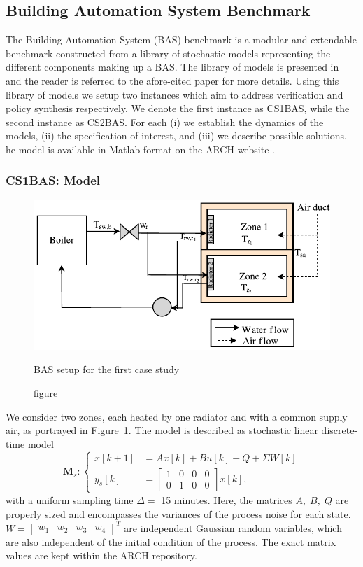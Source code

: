 \subsection{Building Automation System Benchmark}
The Building Automation System (BAS) benchmark is a modular and extendable benchmark  constructed from a  library of stochastic models representing the different components making up a BAS. The library of models is presented in~\cite{Cauchi18ADHS} and the reader is referred to the afore-cited paper for more details. Using this
library of models we setup two instances which aim to address  verification and policy synthesis respectively. We denote the first instance as CS1BAS, while the second instance as CS2BAS.
For each (i) we establish the dynamics of the models, (ii) the specification of interest, and (iii) we describe possible solutions.
he model is available in Matlab format on the ARCH website .

\subsubsection{CS1BAS: Model} 
\begin{figure}[h!]
    \centering
 	\includegraphics[width=0.5\columnwidth]{figures/Cs1.pdf}
 	\caption{figure}{BAS setup for the first case study}
 	\label{fig:cs1:setup}
 \end{figure}
 
We consider two zones, each heated by one radiator and with a common supply air, as portrayed in Figure~\ref{fig:cs1:setup}. 
The model is described as stochastic linear discrete-time model
\begin{equation}\label{mod:s}
	\textbf{M}_s: \begin{cases}
	x[k+1] &=Ax[k] + Bu[k] + Q + \Sigma W[k] \\ %
	y_s[k] &= \begin{bmatrix}
	1&0&0&0\\
	0&1&0&0\end{bmatrix} x[k], 
	\end{cases}
\end{equation}
with a uniform sampling time $\Delta=$ 15 minutes. Here, the matrices $A, \; B, \; Q $ are properly sized  and 
encompasses the variances of the process noise for each state. $W = \begin{bmatrix}w_1& w_2& w_3& w_4\end{bmatrix}^T$ are independent Gaussian random variables, which are also independent of the initial condition of the process. The exact matrix values are kept within the ARCH repository.

